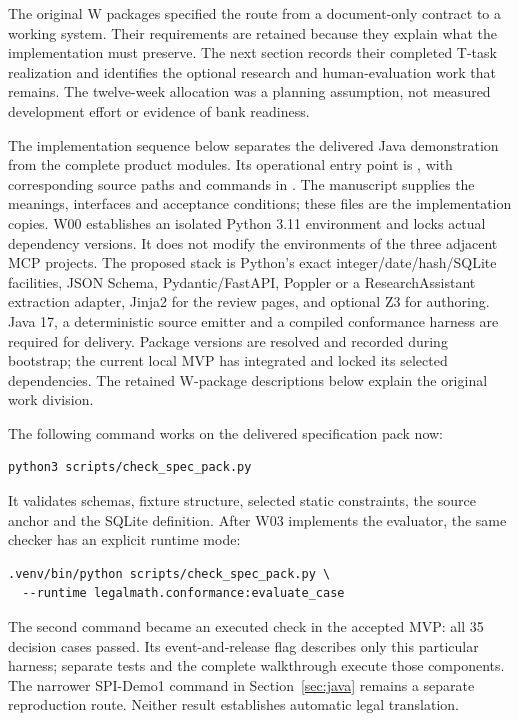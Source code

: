 The original W packages specified the route from a document-only contract to
a working system. Their requirements are retained because they explain what the
implementation must preserve. The next section records their completed T-task
realization and identifies the optional research and human-evaluation work that
remains. The twelve-week allocation was a planning assumption, not measured
development effort or evidence of bank readiness.


\label{merge:P-04-prototype:02}


The implementation sequence below separates the delivered Java demonstration
from the complete product modules. Its operational entry point is
, with corresponding source paths and
commands in . The manuscript supplies the meanings,
interfaces and acceptance conditions; these files are the implementation copies.
W00 establishes an isolated
Python 3.11 environment and locks actual dependency versions. It does not modify
the environments of the three adjacent MCP projects. The proposed stack is
Python's exact integer/date/hash/SQLite facilities, JSON Schema, Pydantic/FastAPI,
Poppler or a ResearchAssistant extraction adapter, Jinja2 for the review pages,
and optional Z3 for authoring. Java 17, a deterministic source emitter and a
compiled conformance harness are required for delivery. Package versions are resolved and recorded during bootstrap;
the current local MVP has integrated and locked its selected dependencies.
The retained W-package descriptions below explain the original work division.

The following command works on the delivered specification pack now:
\begin{lstlisting}
python3 scripts/check_spec_pack.py
\end{lstlisting}
It validates schemas, fixture structure, selected static constraints, the source
anchor and the SQLite definition. After W03 implements the evaluator, the same
checker has an explicit runtime mode:
\begin{lstlisting}
.venv/bin/python scripts/check_spec_pack.py \
  --runtime legalmath.conformance:evaluate_case
\end{lstlisting}
The second command became an executed check in the accepted MVP: all 35
decision cases passed. Its event-and-release flag describes only this particular
harness; separate tests and the complete walkthrough execute those components.
The narrower SPI-Demo1 command in Section~\ref{sec:java} remains a separate
reproduction route. Neither result establishes automatic legal translation.

